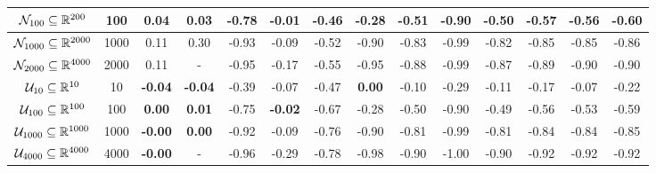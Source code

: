 \begin{table}[h!]
{\begin{tabular}{ | c | c || c | c || c | c | c | c | c |  c | c | c | c | c |}
$\mathcal{N}_{100} \subseteq \mathbb{R}^{200}$&100&\textbf{0.04}&\textbf{0.03}&-0.78&\textbf{-0.01}&-0.46&-0.28&-0.51&-0.90&-0.50&-0.57&-0.56&-0.60\\\hline
$\mathcal{N}_{1000}\subseteq \mathbb{R}^{2000}$&1000&0.11&0.30&-0.93&-0.09&-0.52&-0.90&-0.83&-0.99&-0.82&-0.85&-0.85&-0.86\\\hline
$\mathcal{N}_{2000}\subseteq \mathbb{R}^{4000}$&2000&0.11&-&-0.95&-0.17&-0.55&-0.95&-0.88&-0.99&-0.87&-0.89&-0.90&-0.90\\\hline
$\mathcal{U}_{10} \subseteq \mathbb{R}^{10}$&10&\textbf{-0.04}&\textbf{-0.04}&-0.39&-0.07&-0.47&\textbf{0.00}&-0.10&-0.29&-0.11&-0.17&-0.07&-0.22\\\hline
$\mathcal{U}_{100} \subseteq \mathbb{R}^{100}$&100&\textbf{0.00}&\textbf{0.01}&-0.75&\textbf{-0.02}&-0.67&-0.28&-0.50&-0.90&-0.49&-0.56&-0.53&-0.59\\\hline
$\mathcal{U}_{1000} \subseteq \mathbb{R}^{1000}$&1000&\textbf{-0.00}&\textbf{0.00}&-0.92&-0.09&-0.76&-0.90&-0.81&-0.99&-0.81&-0.84&-0.84&-0.85\\\hline
$\mathcal{U}_{4000} \subseteq \mathbb{R}^{4000}$&4000&\textbf{-0.00}&-&-0.96&-0.29&-0.78&-0.98&-0.90&-1.00&-0.90&-0.92&-0.92&-0.92\\\hline



 \hline\end{tabular}}
\end{table}


